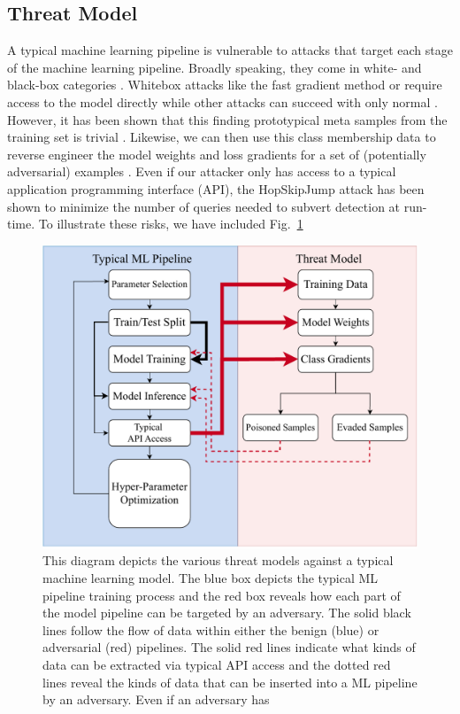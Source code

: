 \documentclass[conference]{IEEEtran}
\begin{document}
\subsection{Threat Model}
A typical machine learning pipeline is vulnerable to attacks that target each stage of the machine learning pipeline. Broadly speaking, they come in white- and black-box categories \cite{meyers}. Whitebox attacks like the fast gradient method \cite{fgm} or \cite{deepfool} require access to the model directly while other attacks can succeed with only normal . However, it has been shown that this finding prototypical meta samples from the training set is trivial \cite{}. Likewise, we can then use this class membership data to reverse engineer the model weights \cite{} and loss gradients for a set of (potentially adversarial) examples \cite{}. Even if our attacker only has access to a typical application programming interface (API), the HopSkipJump attack \cite{hopskipjump} has been shown to minimize the number of queries needed to subvert detection at run-time. To illustrate these risks, we have included Fig.~\ref{fig:threat_model}
\begin{figure}[h!]
    \centering
    \includegraphics[width=.6\textwidth]{images/attack_diagram.pdf}
    \caption{This diagram depicts the various threat models against a typical machine learning model. The blue box depicts the typical ML pipeline training process and the red box reveals how each part of the model pipeline can be targeted by an adversary. The solid black lines follow the flow of data within either the benign (blue) or adversarial (red) pipelines. The solid red lines indicate what kinds of data can be extracted via typical API access and the dotted red lines reveal the kinds of data that can be inserted into a ML pipeline by an adversary. Even if an adversary has}
    \label{fig:threat_model}
\end{figure}
\label{threat}
\end{document}
